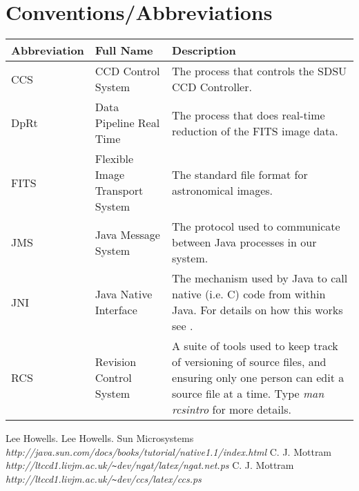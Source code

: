 \documentclass[10pt,a4paper]{article}
\begin{document}
\section{Conventions/Abbreviations}
\begin{center}
\begin{tabular}{|l|l|p{25em}|}
\hline
{\bf Abbreviation} & {\bf Full Name} & {\bf Description} \\
\hline
CCS  & CCD Control System      		& The process that controls the SDSU CCD Controller. \\
DpRt & Data Pipeline Real Time 		& The process that does real-time reduction of the FITS image data. \\
FITS & Flexible Image Transport System 	& The standard file format for astronomical images. \\
JMS  & Java Message System     		& The protocol used to communicate between Java processes in our system. \\
JNI  & Java Native Interface   		& The mechanism used by Java to call native (i.e. C) code from within Java. For
details on how this works see \cite{bib:jnitut}. \\
RCS  & Revision Control System		& A suite of tools used to keep track of versioning of source files, and
ensuring only one person can edit a source file at a time. Type {\em man rcsintro} for more details. \\
\hline
\end{tabular}
\end{center}

\begin{thebibliography}{99}
Lee Howells.
Lee Howells.
Sun Microsystems 
{\em http://java.sun.com/docs/books/tutorial/native1.1/index.html}
C. J. Mottram {\em http://ltccd1.livjm.ac.uk/\verb'~'dev/ngat/latex/ngat.net.ps}
C. J. Mottram {\em http://ltccd1.livjm.ac.uk/\verb'~'dev/ccs/latex/ccs.ps}
\end{thebibliography}
\end{document}
